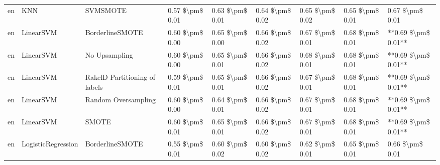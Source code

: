 \begin{tabular}{lllllllll}
      en &                             KNN &                      SVMSMOTE & 0.57 \$\textbackslash pm\$ 0.01 &           0.63 \$\textbackslash pm\$ 0.01 &       0.64 \$\textbackslash pm\$ 0.02 &        0.65 \$\textbackslash pm\$ 0.02 &                         0.65 \$\textbackslash pm\$ 0.01 &     0.67 \$\textbackslash pm\$ 0.01 \\
      en &                       LinearSVM &               BorderlineSMOTE & 0.60 \$\textbackslash pm\$ 0.00 &           0.65 \$\textbackslash pm\$ 0.00 &       0.66 \$\textbackslash pm\$ 0.02 &        0.67 \$\textbackslash pm\$ 0.01 &                         0.68 \$\textbackslash pm\$ 0.01 & **0.69 \$\textbackslash pm\$ 0.01** \\
      en &                       LinearSVM &                 No Upsampling & 0.60 \$\textbackslash pm\$ 0.00 &           0.65 \$\textbackslash pm\$ 0.01 &       0.66 \$\textbackslash pm\$ 0.02 &        0.68 \$\textbackslash pm\$ 0.01 &                         0.68 \$\textbackslash pm\$ 0.01 & **0.69 \$\textbackslash pm\$ 0.01** \\
      en &                       LinearSVM & RakelD Partitioning of labels & 0.59 \$\textbackslash pm\$ 0.01 &           0.65 \$\textbackslash pm\$ 0.01 &       0.66 \$\textbackslash pm\$ 0.02 &        0.67 \$\textbackslash pm\$ 0.01 &                         0.68 \$\textbackslash pm\$ 0.01 & **0.69 \$\textbackslash pm\$ 0.01** \\
      en &                       LinearSVM &           Random Oversampling & 0.60 \$\textbackslash pm\$ 0.00 &           0.64 \$\textbackslash pm\$ 0.01 &       0.66 \$\textbackslash pm\$ 0.02 &        0.67 \$\textbackslash pm\$ 0.01 &                         0.68 \$\textbackslash pm\$ 0.01 & **0.69 \$\textbackslash pm\$ 0.01** \\
      en &                       LinearSVM &                         SMOTE & 0.60 \$\textbackslash pm\$ 0.01 &           0.65 \$\textbackslash pm\$ 0.01 &       0.66 \$\textbackslash pm\$ 0.02 &        0.67 \$\textbackslash pm\$ 0.01 &                         0.68 \$\textbackslash pm\$ 0.01 & **0.69 \$\textbackslash pm\$ 0.01** \\
      en &              LogisticRegression &               BorderlineSMOTE & 0.55 \$\textbackslash pm\$ 0.01 &           0.60 \$\textbackslash pm\$ 0.02 &       0.60 \$\textbackslash pm\$ 0.02 &        0.62 \$\textbackslash pm\$ 0.01 &                         0.65 \$\textbackslash pm\$ 0.01 &     0.66 \$\textbackslash pm\$ 0.01 \\

\end{tabular}
